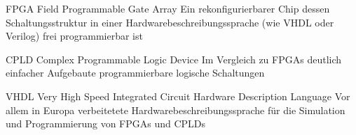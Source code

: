
	{FPGA}
	{Field Programmable Gate Array}
	{Ein rekonfigurierbarer Chip dessen Schaltungsstruktur in einer Hardwarebeschreibungssprache (wie VHDL oder Verilog) frei programmierbar ist\cite{wiki:FPGA}} 

	{CPLD}
	{Complex Programmable Logic Device}
	{Im Vergleich zu FPGAs deutlich einfacher Aufgebaute programmierbare logische Schaltungen\cite{wiki:CPLD}}

	{VHDL}
	{Very High Speed Integrated Circuit Hardware Description Language}
	{Vor allem in Europa verbeitetete Hardwarebeschreibungssprache für die Simulation und Programmierung von FPGAs und CPLDs\cite{wiki:VHDL}}



